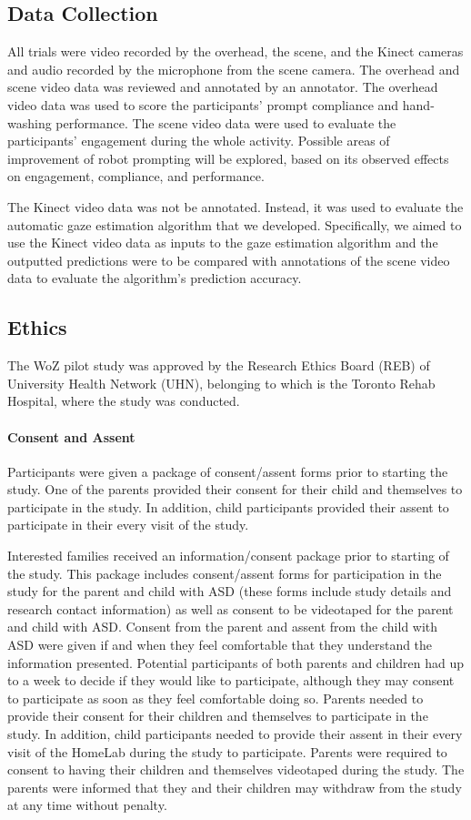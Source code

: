 \subsection{Data Collection}
All trials were video recorded by the overhead, the scene, and the Kinect cameras and audio recorded by the microphone from the scene camera.  The overhead and scene video data was reviewed and annotated by an annotator. The overhead video data was used to score the participants' prompt compliance and hand-washing performance. The scene video data were used to evaluate the participants' engagement during the whole activity. Possible areas of improvement of robot prompting will be explored, based on its observed effects on engagement, compliance, and performance.

The Kinect video data was not be annotated. Instead, it was used to evaluate the automatic gaze estimation algorithm that we developed. Specifically, we aimed to use the Kinect video data as inputs to the gaze estimation algorithm and the outputted predictions were to be compared with annotations of the scene video data to evaluate the algorithm's prediction accuracy.



\subsection{Ethics}
The WoZ pilot study was approved by the Research Ethics Board (REB) of University Health Network (UHN), belonging to which is the Toronto Rehab Hospital, where the study was conducted.

\paragraph{Consent and Assent}
Participants were given a package of consent/assent forms prior to starting the study. One of the parents provided their consent for their child and themselves to participate in the study. In addition, child participants provided their assent to participate in their every visit of the study. 

Interested families received an information/consent package prior to starting of the study. This package includes consent/assent forms for participation in the study for the parent and child with ASD (these forms include study details and research contact information) as well as consent to be videotaped for the parent and child with ASD. Consent from the parent and assent from the child with ASD were given if and when they feel comfortable that they understand the information presented. Potential participants of both parents and children had up to a week to decide if they would like to participate, although they may consent to participate as soon as they feel comfortable doing so. Parents needed to provide their consent for their children and themselves to participate in the study. In addition, child participants needed to provide their assent in their every visit of the HomeLab during the study to participate. Parents were required to consent to having their children and themselves videotaped during the study. The parents were informed that they and their children may withdraw from the study at any time without penalty.


